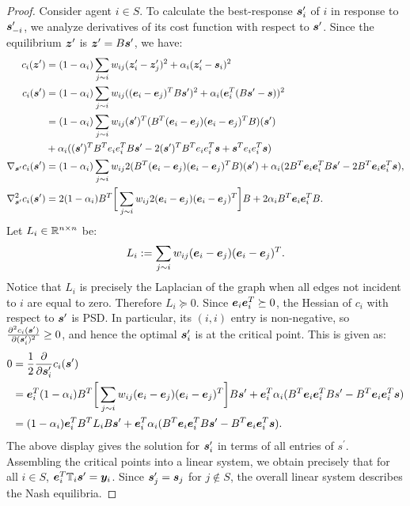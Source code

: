 \begin{proof}
Consider agent $i \in S$. To calculate the best-response $\bm{s}_i^\prime$ of $i$ in response to $\bm{s}_{-i}^{\prime}$, we analyze derivatives of its cost function with respect to $\bm{s}^\prime$. Since the equilibrium $\bm{z}^\prime$ is $\bm{z}^\prime = B \bm{s}^\prime$, we have: 
\begin{align*}
c_i(\bm{z}^\prime) &= (1 - \alpha_i) \sum_{j \sim i}
w_{ij} (\bm{z}_i^\prime - \bm{z}_j^\prime)^2 + \alpha_i (\bm{z}_i^\prime - \bm{s}_i)^2 \\
c_i(\bm{s}^\prime) &= (1 - \alpha_i) \sum_{j \sim i}
w_{ij} ((\bm{e}_i - \bm{e}_j)^T B \bm{s}^\prime)^2 
+ \alpha_i (\bm{e}_i^T (B \bm{s}^\prime - \bm{s}))^2 \\
&=  (1 - \alpha_i) \sum_{j \sim i}
w_{ij} (\bm{s}^\prime)^T (B^T (\bm{e}_i - \bm{e}_j) (\bm{e}_i - \bm{e}_j)^T B) (\bm{s}^\prime) \\
&+ \alpha_i ((\bm{s}^\prime)^T B^T e_i e_i^T B \bm{s}^\prime 
- 2 (\bm{s}^\prime)^T B^T e_i e_i^T \bm{s} 
+ \bm{s}^T e_i e_i^T \bm{s}) \\
\nabla_{\bm{s}^\prime} c_i(\bm{s}^\prime) 
&= (1 - \alpha_i) \sum_{j \sim i}
w_{ij} 2 (B^T (\bm{e}_i - \bm{e}_j) (\bm{e}_i - \bm{e}_j)^T B) (\bm{s}^\prime) 
+ \alpha_i (2 B^T \bm{e}_i \bm{e}_i^T B \bm{s}^\prime 
- 2 B^T \bm{e}_i \bm{e}_i^T \bm{s}), \\
\nabla_{\bm{s}^\prime}^2 c_i(\bm{s}^\prime) &= 2 (1 - \alpha_i) B^T \bigg[\sum_{j \sim i}
w_{ij} 2 (\bm{e}_i - \bm{e}_j) (\bm{e}_i - \bm{e}_j)^T \bigg] B
+2  \alpha_i B^T \bm{e}_i \bm{e}_i^T B.
 \end{align*}
 Let $L_i \in \mathbb{R}^{n \times n}$ be: 
 \begin{align*}
L_i := \sum_{j \sim i} w_{ij} (\bm{e}_i - \bm{e}_j) (\bm{e}_i - \bm{e}_j)^T  .
\end{align*}
Notice that $L_i$ is precisely the Laplacian of the graph when all edges not incident to $i$ are equal to zero. Therefore $L_i \succeq 0$. Since $\bm{e}_i \bm{e}_i^T \succeq 0$, the Hessian of $c_i$ with respect to $\bm{s}^\prime$ is PSD. In particular, its $(i,i)$ entry is non-negative, so $\frac{\partial^2 c_i(\bm{s}^\prime)}{\partial (\bm{s}_i^\prime)^2} \geq 0$, and hence the optimal $\bm{s}_i^\prime$ is at the critical point. This is given as: 
\begin{align*}
0 &= \frac{1}{2} \frac{\partial}{\partial \bm{s}_i^\prime} c_i(\bm{s}^\prime) \\
&= \bm{e}_i^T (1 - \alpha_i) B^T \bigg[\sum_{j \sim i}
w_{ij} (\bm{e}_i - \bm{e}_j) (\bm{e}_i - \bm{e}_j)^T \bigg] B \bm{s}^\prime 
+ \bm{e}_i^T \alpha_i (B^T \bm{e}_i \bm{e}_i^T B s^\prime - B^T \bm{e}_i \bm{e}_i^T \bm{s}) \\
&= (1 - \alpha_i) \bm{e}_i^T B^T L_i B \bm{s}^\prime 
+ \bm{e}_i^T \alpha_i (B^T \bm{e}_i \bm{e}_i^T B \bm{s}^\prime - B^T \bm{e}_i \bm{e}_i^T \bm{s}).
\end{align*}
The above display gives the solution for $\bm{s}_i^\prime$ in terms of all entries of $s^\prime$. Assembling the critical points into a linear system, we obtain precisely that for all $i \in S$, $\bm{e}_i^T \mathbb T_i \bm{s}^\prime = \bm{y}_i$. Since $\bm{s}_j^\prime = \bm{s}_j$ for $j \not \in S$, the overall linear system describes the Nash equilibria. 
\end{proof}

